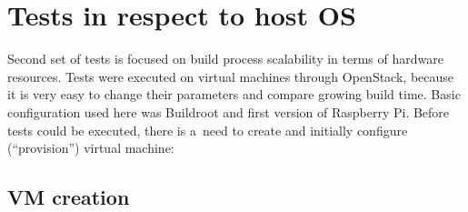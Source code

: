 \documentclass[printmode]{mgr}
\begin{document}













\section{Tests in respect to host OS}

Second set of tests is focused on build process scalability in terms of hardware resources.
Tests were executed on virtual machines through OpenStack, because it is very easy to change their parameters and compare growing build time.
Basic configuration used here was Buildroot and first version of Raspberry Pi.
Before tests could be executed, there is a~need to create and initially configure (``provision'') virtual machine:

\subsection*{VM creation}
\end{document}

